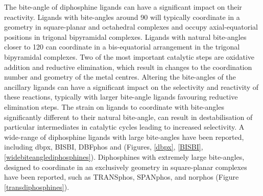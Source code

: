 The bite-angle of diphosphine ligands can have a significant impact on their reactivity.  Ligands with bite-angles around 90\degrees{} will typically coordinate in a \cis{} geometry in square-planar and octahedral complexes and occupy axial-equatorial positions in trigonal bipyramidal complexes.  Ligands with natural bite-angles closer to 120\degrees{} can coordinate in a bis-equatorial arrangement in the trigonal bipyramidal complexes.\cite{Kranenburg1995}  Two of the most important catalytic steps are oxidative addition and reductive elimination, which result in changes to the coordination number and geometry of the metal centres.\cite{Tsuji1995}  Altering the bite-angles of the ancillary ligands can have a significant impact on the selectivity and reactivity of these reactions, typically with larger bite-angle ligands favouring reductive elimination steps.\cite{Freixa2003}  The strain on ligands to coordinate with bite-angles significantly different to their natural bite-angle, can result in destabilisation of particular intermediates in catalytic cycles leading to increased selectivity.\cite{Freixa2003}  A wide-range of diphosphine ligands with large bite-angles have been reported, including dbpx, BISBI, DBFphos and \Phxantphos{} (Figures, \ref{dbpx}, \ref{BISBI}, \ref{widebiteanglediphosphines}).  Diphosphines with extremely large bite-angles, designed to coordinate in an exclusively \trans{} geometry in square-planar complexes have been reported, such as TRANSphos, SPANphos, and norphos (Figure \ref{transdiphosphines})\cite{Freixa2003b, Kamer2001, Dierkes1999}.


